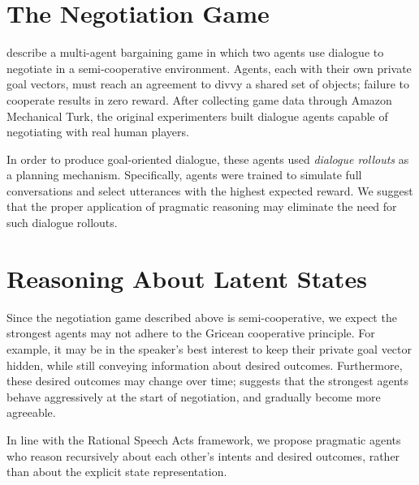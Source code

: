 \documentclass{article}
\begin{document}
\section{The Negotiation Game}

\citet{lewis2017deal} describe a multi-agent bargaining game in which two agents use dialogue to negotiate in a semi-cooperative environment. Agents, each with their own private goal vectors, must reach an agreement to divvy a shared set of objects; failure to cooperate results in zero reward. After collecting game data through Amazon Mechanical Turk, the original experimenters built dialogue agents capable of negotiating with real human players.

In order to produce goal-oriented dialogue, these agents used \textit{dialogue rollouts} as a planning mechanism. Specifically, agents were trained to simulate full conversations and select utterances with the highest expected reward. We suggest that the proper application of pragmatic reasoning may eliminate the need for such dialogue rollouts.

\section{Reasoning About Latent States}

Since the negotiation game described above is semi-cooperative, we expect the strongest agents may not adhere to the Gricean cooperative principle. For example, it may be in the speaker's best interest to keep their private goal vector hidden, while still conveying information about desired outcomes. Furthermore, these desired outcomes may change over time; \citet{chenbuilding} suggests that the strongest agents behave aggressively at the start of negotiation, and gradually become more agreeable.

In line with the Rational Speech Acts framework, we propose pragmatic agents who reason recursively about each other's intents and desired outcomes, rather than about the explicit state representation. 




\end{document}
